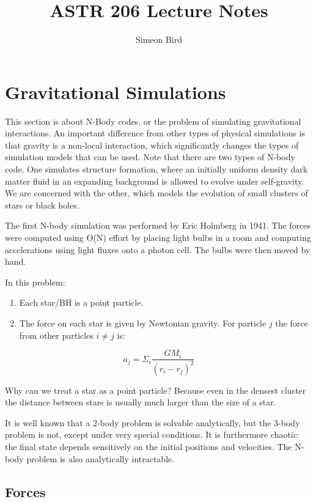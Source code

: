 \documentclass[12pt]{article}
\title{ASTR 206 Lecture Notes}
\author{Simeon Bird}
\begin{document}
\maketitle

\section{Gravitational Simulations}

This section is about N-Body codes, or the problem of simulating gravitational interactions. An important difference from other types of physical simulations is that gravity is a non-local interaction, which significantly changes the types of simulation models that can be used. Note that there are two types of N-body code. One simulates structure formation, where an initially uniform density dark matter fluid in an expanding background is allowed to evolve under self-gravity. We are concerned with the other, which models the evolution of small clusters of stars or black holes.

The first N-body simulation was performed by Eric Holmberg in 1941. The forces were computed using O(N) effort by placing light bulbs in a room and computing accelerations using light fluxes onto a photon cell. The bulbs were then moved by hand.

In this problem:

\begin{enumerate}
 \item Each star/BH is a point particle.
 \item The force on each star is given by Newtonian gravity. For particle $j$ the force from other particles $i \neq j$ is:
\end{enumerate}
\begin{equation}
 a_j = \Sigma_i \frac{G M_i}{\left(r_i - r_j\right)^2}
\end{equation}

Why can we treat a star as a point particle? Because even in the densest cluster the distance between stars is usually much larger than the size of a star.

It is well known that a 2-body problem is solvable analytically, but the 3-body problem is not, except under very special conditions. It is furthermore chaotic: the final state depends sensitively on the initial positions and velocities. The N-body problem is also analytically intractable.

\subsection{Forces}
\end{document}
